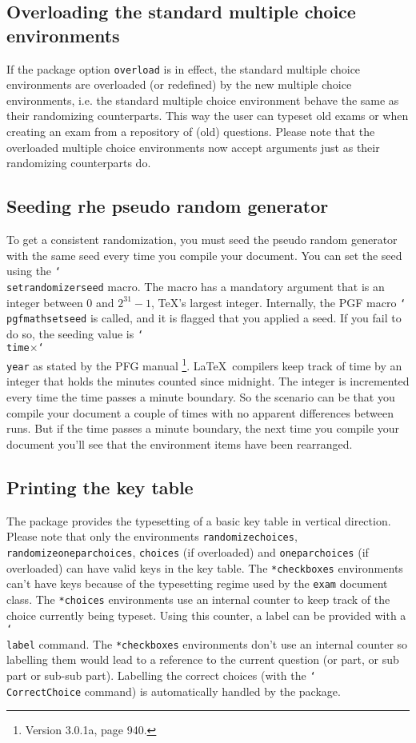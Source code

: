 \documentclass[12pt,a4paper]{exam}
\providecommand{\texorpdfstring}[2]{#1}
\newcommand{\bs}{\texorpdfstring{\char`\\}{}}
\begin{document}
\subsection{Overloading the standard multiple choice environments}
If the package option \texttt{overload} is in effect, the standard multiple choice
environments are overloaded (or redefined) by the new multiple choice environments,
i.e. the standard multiple choice environment behave the same as their
randomizing counterparts. This way the user can typeset old exams or when creating
an exam from a repository of (old) questions. Please note that the overloaded
multiple choice environments now accept arguments just as their randomizing
counterparts do.


\subsection{Seeding rhe pseudo random generator}
\label{sec:seeding}
To get a consistent randomization, you must seed the pseudo random generator
with the same seed every time you compile your document. You can set the
seed using the \texttt{\bs setrandomizerseed} macro. The macro has a mandatory
argument that is an integer between 0 and $2^{31}-1$, \TeX's largest integer.
Internally, the PGF macro \texttt{\bs pgfmathsetseed} is called, and it is
flagged that you applied a seed. If you fail to do so, the seeding value is
\texttt{\bs time}$\times$\texttt{\bs year} as stated by the PFG manual%
\footnote{Version 3.0.1a, page 940.}. \LaTeX\ compilers keep track of
time by an integer that holds the minutes counted since midnight. The integer is
incremented every time the time passes a minute boundary. So the scenario
can be that you compile your document a couple of times with no apparent
differences between runs. But if the time passes a minute boundary, the
next time you compile your document you'll see that the environment items
have been rearranged.

\subsection{Printing the key table}
The package provides the typesetting of a basic key table in vertical direction.
Please note that only the environments \texttt{randomizechoices},
\texttt{randomizeoneparchoices}, \texttt{choices} (if overloaded) and
\texttt{oneparchoices} (if overloaded) can have valid keys in the key table.
The \texttt{*checkboxes} environments can't 
have keys because of the typesetting regime used by the \texttt{exam}
document class. The \texttt{*choices} environments use an internal counter
to keep track of the choice currently being typeset. Using this counter, a
label can be provided with a \texttt{\bs label} command.
The \texttt{*checkboxes} environments don't use an internal counter so 
labelling them would lead to a reference to the current question (or part,
or sub part or sub-sub part). Labelling the correct choices (with the
\texttt{\bs CorrectChoice} command) is automatically handled by the
package.
\end{document}
